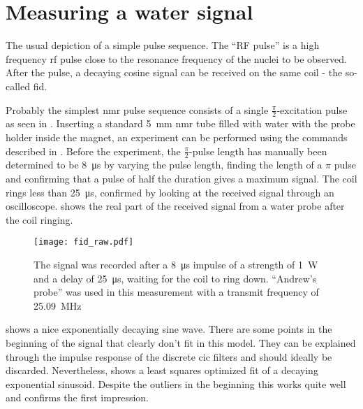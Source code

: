 \section{Measuring a water signal}

\begin{marginfigure}
    \centering
    
    \caption{ The usual depiction of a simple pulse sequence. The \enquote{RF pulse} is a high frequency \acrshort{rf} pulse close to the resonance frequency of the nuclei to be observed. After the pulse, a decaying cosine signal can be received on the same coil -  the so-called \acrfull{fid}.}
\end{marginfigure}

Probably the simplest \acrshort{nmr} pulse sequence consists of a single \(\frac{\pi}{2}\)-excitation pulse as seen in . Inserting a standard \qty{5}{\milli\metre} \acrshort{nmr} tube filled with water with the probe holder inside the magnet, an experiment can be performed using the commands described in . Before the experiment, the \(\frac{\pi}{2}\)-pulse length has manually been determined to be \qty{8}{\micro\second} by varying the pulse length, finding the length of a \(\pi\) pulse and confirming that a pulse of half the duration gives a maximum signal. The coil rings less than \qty{25}{\micro\second}, confirmed by looking at the received signal through an oscilloscope.  shows the real part of the received signal from a water probe after the coil ringing.

\begin{figure}[h!bt]
    \centering
    \texttt{[image: fid\_raw.pdf]}
    \caption{ The signal was recorded after a \qty{8}{\micro\second} impulse of a strength of \qty{1}{\watt} and a delay of \qty{25}{\micro\second}, waiting for the coil to ring down. \enquote{Andrew's probe} was used in this measurement with a transmit frequency of \qty{25.09}{\mega\hertz}}
\end{figure}

 shows a nice exponentially decaying sine wave. There are some points in the beginning of the signal that clearly don't fit in this model. They can be explained through the impulse response of the discrete \acrshort{cic} filters and should ideally be discarded. Nevertheless,  shows a least squares optimized fit of a decaying exponential sinusoid. Despite the outliers in the beginning this works quite well and confirms the first impression.

